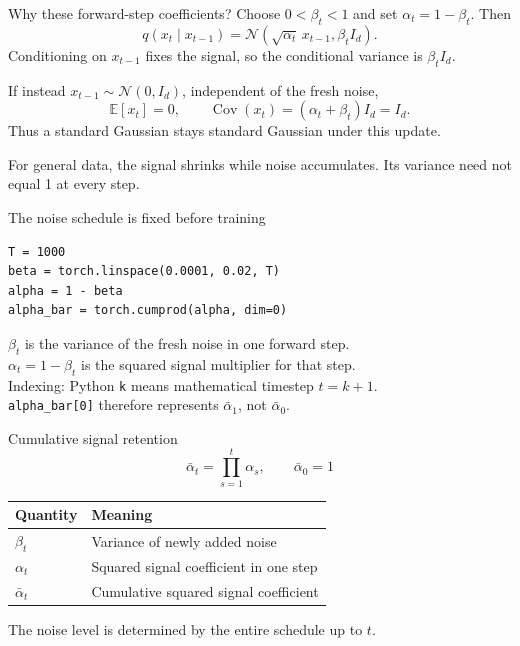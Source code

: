 \documentclass[aspectratio=169,11pt]{beamer}
\begin{document}
\begin{frame}{Why these forward-step coefficients?}
Choose $0<\beta_t<1$ and set $\alpha_t=1-\beta_t$. Then
\[q(x_t\mid x_{t-1})=\mathcal N(\sqrt{\alpha_t}\,x_{t-1},\beta_t I_d).\]
Conditioning on $x_{t-1}$ fixes the signal, so the conditional variance is $\beta_t I_d$.
\par\vspace{3mm}
If instead $x_{t-1}\sim\mathcal N(0,I_d)$, independent of the fresh noise,
\[\mathbb E[x_t]=0,\qquad
\operatorname{Cov}(x_t)=(\alpha_t+\beta_t)I_d=I_d.\]
Thus a standard Gaussian stays standard Gaussian under this update.
\par\vspace{3mm}
For general data, the signal shrinks while noise accumulates. Its variance need not equal 1 at every step.
\end{frame}

\begin{frame}[fragile]{The noise schedule is fixed before training}
\begin{lstlisting}
T = 1000
beta = torch.linspace(0.0001, 0.02, T)
alpha = 1 - beta
alpha_bar = torch.cumprod(alpha, dim=0)
\end{lstlisting}
\par\vspace{3mm}
$\beta_t$ is the variance of the fresh noise in one forward step.\\[3mm]
$\alpha_t=1-\beta_t$ is the squared signal multiplier for that step.\\[3mm]
\alert{Indexing:} Python \texttt{k} means mathematical timestep $t=k+1$.\\[2mm]
\texttt{alpha\_bar[0]} therefore represents $\bar\alpha_1$, not $\bar\alpha_0$.
\end{frame}

\begin{frame}{Cumulative signal retention}
\large
\[\bar\alpha_t=\prod_{s=1}^{t}\alpha_s,\qquad\bar\alpha_0=1\]
\normalsize
\begin{center}
\begin{tabular}{ll}
\toprule
Quantity & Meaning\\\midrule
$\beta_t$ & Variance of newly added noise\\[3mm]
$\alpha_t$ & Squared signal coefficient in one step\\[3mm]
$\bar\alpha_t$ & Cumulative squared signal coefficient\\\bottomrule
\end{tabular}
\end{center}
\par\vspace{4mm}
The noise level is determined by the entire schedule up to $t$.
\end{frame}
\end{document}
